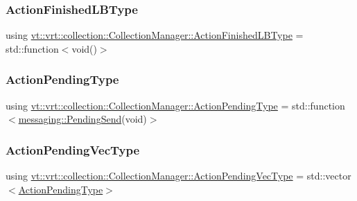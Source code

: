 \subsubsection{\texorpdfstring{Action\+Finished\+L\+B\+Type}{ActionFinishedLBType}}
{\footnotesize\ttfamily using \hyperlink{structvt_1_1vrt_1_1collection_1_1_collection_manager_a2649daab7b437e1e2bdb5f2eefff29b6}{vt\+::vrt\+::collection\+::\+Collection\+Manager\+::\+Action\+Finished\+L\+B\+Type} =  std\+::function$<$void()$>$}

\mbox{\label{structvt_1_1vrt_1_1collection_1_1_collection_manager_a61252b0d805cdb8fdea35439de468001}} 
\subsubsection{\texorpdfstring{Action\+Pending\+Type}{ActionPendingType}}
{\footnotesize\ttfamily using \hyperlink{structvt_1_1vrt_1_1collection_1_1_collection_manager_a61252b0d805cdb8fdea35439de468001}{vt\+::vrt\+::collection\+::\+Collection\+Manager\+::\+Action\+Pending\+Type} =  std\+::function$<$\hyperlink{structvt_1_1messaging_1_1_pending_send}{messaging\+::\+Pending\+Send}(void)$>$\hspace{0.3cm}{\ttfamily [private]}}

\mbox{\label{structvt_1_1vrt_1_1collection_1_1_collection_manager_a3e6c49166f298e9aada17c9dcaa080dd}} 
\subsubsection{\texorpdfstring{Action\+Pending\+Vec\+Type}{ActionPendingVecType}}
{\footnotesize\ttfamily using \hyperlink{structvt_1_1vrt_1_1collection_1_1_collection_manager_a3e6c49166f298e9aada17c9dcaa080dd}{vt\+::vrt\+::collection\+::\+Collection\+Manager\+::\+Action\+Pending\+Vec\+Type} =  std\+::vector$<$\hyperlink{structvt_1_1vrt_1_1collection_1_1_collection_manager_a61252b0d805cdb8fdea35439de468001}{Action\+Pending\+Type}$>$\hspace{0.3cm}{\ttfamily [private]}}

